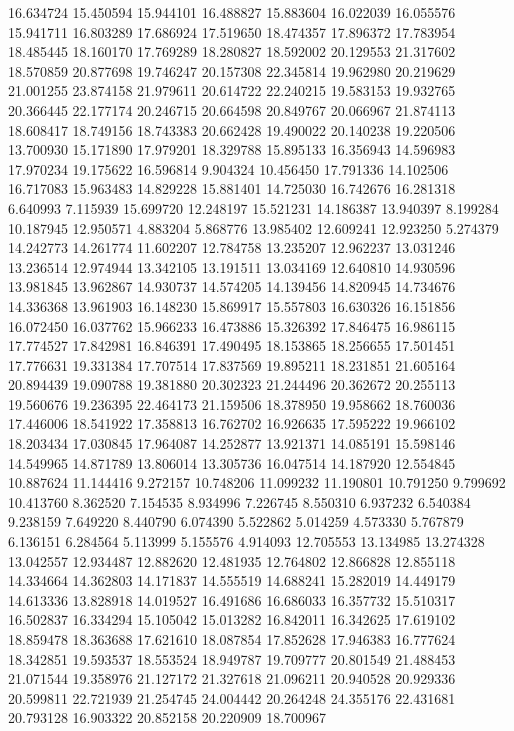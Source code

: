 16.634724
15.450594
15.944101
16.488827
15.883604
16.022039
16.055576
15.941711
16.803289
17.686924
17.519650
18.474357
17.896372
17.783954
18.485445
18.160170
17.769289
18.280827
18.592002
20.129553
21.317602
18.570859
20.877698
19.746247
20.157308
22.345814
19.962980
20.219629
21.001255
23.874158
21.979611
20.614722
22.240215
19.583153
19.932765
20.366445
22.177174
20.246715
20.664598
20.849767
20.066967
21.874113
18.608417
18.749156
18.743383
20.662428
19.490022
20.140238
19.220506
13.700930
15.171890
17.979201
18.329788
15.895133
16.356943
14.596983
17.970234
19.175622
16.596814
9.904324
10.456450
17.791336
14.102506
16.717083
15.963483
14.829228
15.881401
14.725030
16.742676
16.281318
6.640993
7.115939
15.699720
12.248197
15.521231
14.186387
13.940397
8.199284
10.187945
12.950571
4.883204
5.868776
13.985402
12.609241
12.923250
5.274379
14.242773
14.261774
11.602207
12.784758
13.235207
12.962237
13.031246
13.236514
12.974944
13.342105
13.191511
13.034169
12.640810
14.930596
13.981845
13.962867
14.930737
14.574205
14.139456
14.820945
14.734676
14.336368
13.961903
16.148230
15.869917
15.557803
16.630326
16.151856
16.072450
16.037762
15.966233
16.473886
15.326392
17.846475
16.986115
17.774527
17.842981
16.846391
17.490495
18.153865
18.256655
17.501451
17.776631
19.331384
17.707514
17.837569
19.895211
18.231851
21.605164
20.894439
19.090788
19.381880
20.302323
21.244496
20.362672
20.255113
19.560676
19.236395
22.464173
21.159506
18.378950
19.958662
18.760036
17.446006
18.541922
17.358813
16.762702
16.926635
17.595222
19.966102
18.203434
17.030845
17.964087
14.252877
13.921371
14.085191
15.598146
14.549965
14.871789
13.806014
13.305736
16.047514
14.187920
12.554845
10.887624
11.144416
9.272157
10.748206
11.099232
11.190801
10.791250
9.799692
10.413760
8.362520
7.154535
8.934996
7.226745
8.550310
6.937232
6.540384
9.238159
7.649220
8.440790
6.074390
5.522862
5.014259
4.573330
5.767879
6.136151
6.284564
5.113999
5.155576
4.914093
12.705553
13.134985
13.274328
13.042557
12.934487
12.882620
12.481935
12.764802
12.866828
12.855118
14.334664
14.362803
14.171837
14.555519
14.688241
15.282019
14.449179
14.613336
13.828918
14.019527
16.491686
16.686033
16.357732
15.510317
16.502837
16.334294
15.105042
15.013282
16.842011
16.342625
17.619102
18.859478
18.363688
17.621610
18.087854
17.852628
17.946383
16.777624
18.342851
19.593537
18.553524
18.949787
19.709777
20.801549
21.488453
21.071544
19.358976
21.127172
21.327618
21.096211
20.940528
20.929336
20.599811
22.721939
21.254745
24.004442
20.264248
24.355176
22.431681
20.793128
16.903322
20.852158
20.220909
18.700967

